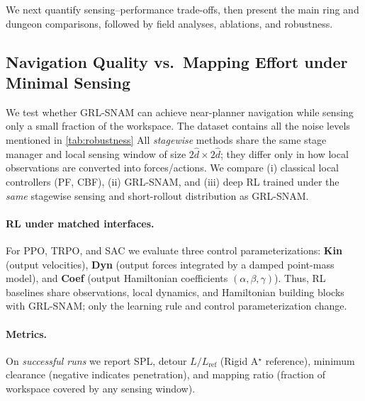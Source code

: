 We next quantify sensing--performance trade-offs, then present the main ring and dungeon comparisons, followed by field analyses, ablations, and robustness.

\subsection{Navigation Quality vs.\ Mapping Effort under Minimal Sensing}
\label{subsec:minimal_sensing}

We test whether GRL-SNAM can achieve near-planner navigation while sensing only a small fraction of the workspace. {The dataset contains all the noise levels mentioned in \cref{tab:robustness}}
All \emph{stagewise} methods share the same stage manager and local sensing window of size $2\hat d \times 2\hat d$; they differ only in how local observations are converted into forces/actions. We compare (i) classical local controllers (PF, CBF), (ii) GRL-SNAM, and (iii) deep RL trained under the \emph{same} stagewise sensing and short-rollout distribution as GRL-SNAM.

\paragraph{RL under matched interfaces.}
For PPO, TRPO, and SAC we evaluate three control parameterizations:
\textbf{Kin} (output velocities), \textbf{Dyn} (output forces integrated by a damped point-mass model), and \textbf{Coef} (output Hamiltonian coefficients $(\alpha,\beta,\gamma)$). 
Thus, RL baselines share observations, local dynamics, and Hamiltonian building blocks with GRL-SNAM; only the learning rule and control parameterization change.

\paragraph{Metrics.}
On \emph{successful runs} we report SPL, detour $L/L_{\mathrm{ref}}$ (Rigid A$^{\star}$ reference), minimum clearance (negative indicates penetration), and mapping ratio (fraction of workspace covered by any sensing window).

